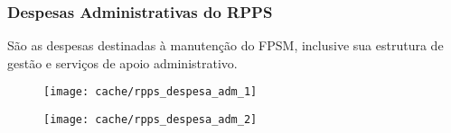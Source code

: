 
\subsubsection{Despesas Administrativas do RPPS}

São as despesas destinadas à manutenção do FPSM, inclusive sua estrutura de gestão e serviços de apoio administrativo.





\begin{figure}[H]
\center
\texttt{[image: cache/rpps\_despesa\_adm\_1]}
\end{figure}

\begin{figure}[H]
\center
\texttt{[image: cache/rpps\_despesa\_adm\_2]}
\end{figure}

